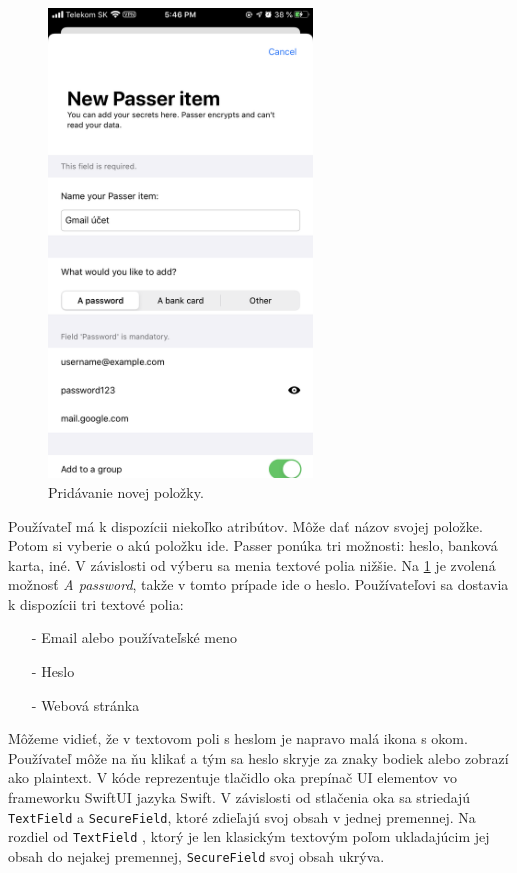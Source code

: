 \begin{figure}[H]
  \centering
  \includegraphics[width=7cm]{img/passer2.PNG}
  \caption{Pridávanie novej položky.}
  \label{passer2}
\end{figure}

Používateľ má k dispozícii niekoľko atribútov. Môže dať názov svojej položke. Potom si vyberie o akú položku ide. Passer ponúka tri možnosti: heslo, banková karta, iné. V závislosti od výberu sa menia textové polia nižšie. Na \figurename{ \ref{passer2}} je zvolená možnosť \textit{A password}, takže v tomto prípade ide o heslo. Používateľovi sa dostavia k dispozícii tri textové polia:
\begin{itemize}
    \item[-] Email alebo používateľské meno
    \item[-] Heslo
    \item[-] Webová stránka
\end{itemize}

Môžeme vidieť, že v textovom poli s heslom je napravo malá ikona s okom. Používateľ môže na ňu klikať a tým sa heslo skryje za znaky bodiek alebo zobrazí ako plaintext. V kóde reprezentuje tlačidlo oka prepínač UI elementov vo frameworku SwiftUI jazyka Swift. V závislosti od stlačenia oka sa striedajú \texttt{TextField} a \texttt{SecureField}, ktoré zdieľajú svoj obsah v jednej premennej. Na rozdiel od \texttt{TextField} \cite{textfield_swiftui}, ktorý je len klasickým textovým poľom ukladajúcim jej obsah do nejakej premennej, \texttt{SecureField} \cite{securefield_swiftui} svoj obsah ukrýva.

